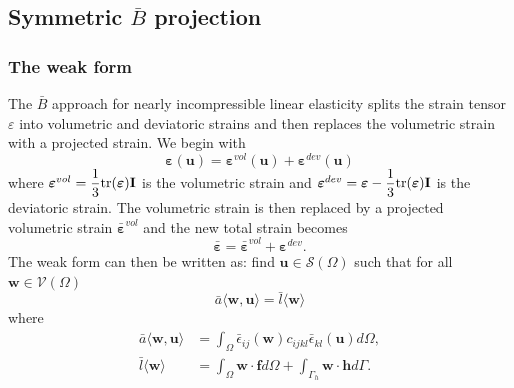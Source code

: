 \subsection{Symmetric \Bezier $\bar{B}$ projection}
\subsubsection{The weak form}
The $\bar{B}$ approach for nearly incompressible linear elasticity splits the strain tensor $\varepsilon$ into volumetric and deviatoric strains and then replaces the volumetric strain with a projected strain. We begin with
\begin{equation}
    \boldsymbol{\varepsilon}(\mathbf{u})=\boldsymbol{\varepsilon}^{vol}(\mathbf{u})+\boldsymbol{\varepsilon}^{dev}(\mathbf{u})
\end{equation}
where $\boldsymbol{\varepsilon}^{vol}=\dfrac{1}{3}\mathrm{tr}(\boldsymbol{\varepsilon})\mathbf{I}$ is the volumetric strain and $\boldsymbol{\varepsilon}^{dev}=\boldsymbol{\varepsilon}-\dfrac{1}{3}\mathrm{tr}(\boldsymbol{\varepsilon})\mathbf{I}$ is the deviatoric strain. The volumetric strain is then replaced by a projected volumetric strain $\bar{\boldsymbol{\varepsilon}}^{vol}$ and the new total strain becomes
\begin{equation}
    \bar{\boldsymbol{\varepsilon}}=\bar{\boldsymbol{\varepsilon}}^{vol}+\boldsymbol{\varepsilon}^{dev}.
\end{equation}
The weak form can then be written as: find $\mathbf{u}\in{\mathcal{S}(\Omega)}$ such that for all $\mathbf{w}\in{\mathcal{V}(\Omega)}$
\begin{equation}
    \bar{a}\langle{\mathbf{w},\mathbf{u}}\rangle=\bar{l}\langle{\mathbf{w}}\rangle
\end{equation}
where
\begin{align}
    \bar{a}\langle{\mathbf{w},\mathbf{u}}\rangle & =\int_{\Omega}\bar{\epsilon}_{ij}(\mathbf{w})c_{ijkl}\bar{\epsilon}_{kl}(\mathbf{u})d\Omega,      \\
    \bar{l}\langle{\mathbf{w}}\rangle            & =\int_{\Omega}\mathbf{w}\cdot\mathbf{f}d\Omega+\int_{\Gamma_{h}}\mathbf{w}\cdot\mathbf{h}d\Gamma.
\end{align}

